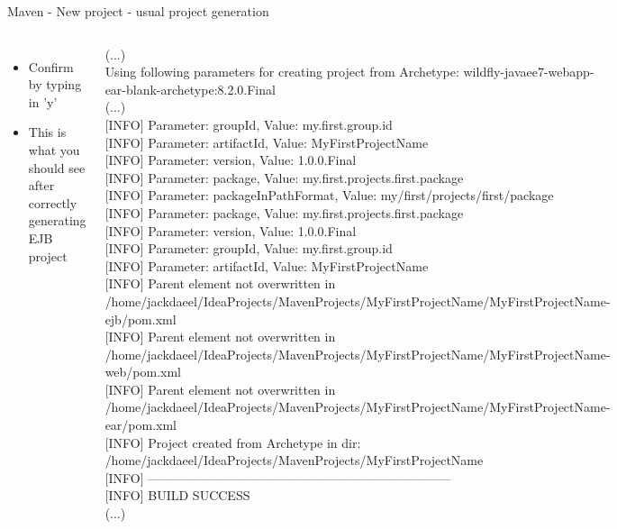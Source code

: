 \documentclass[aspectratio=1610,english]{beamer} %
\begin{document}
\begin{frame}{Maven - New project - usual project generation}
\begin{columns}
				\begin{itemize}
					\tiny
					\color{black}
					\item Confirm by typing in 'y'
					\item This is what you should see after correctly generating EJB project
				\end{itemize}
				\fontsize{4}{5} \selectfont
				(...) \\
				Using following parameters for creating project from Archetype: wildfly-javaee7-webapp-ear-blank-archetype:8.2.0.Final \\
				(...) \\
				{[INFO]} Parameter: groupId, Value: my.first.group.id \\
				{[INFO]} Parameter: artifactId, Value: MyFirstProjectName \\
				{[INFO]} Parameter: version, Value: 1.0.0.Final \\
				{[INFO]} Parameter: package, Value: my.first.projects.first.package \\
				{[INFO]} Parameter: packageInPathFormat, Value: my/first/projects/first/package \\
				{[INFO]} Parameter: package, Value: my.first.projects.first.package \\
				{[INFO]} Parameter: version, Value: 1.0.0.Final \\
				{[INFO]} Parameter: groupId, Value: my.first.group.id \\
				{[INFO]} Parameter: artifactId, Value: MyFirstProjectName \\
				{[INFO]} Parent element not overwritten in /home/jackdaeel/IdeaProjects/MavenProjects/MyFirstProjectName/MyFirstProjectName-ejb/pom.xml \\ 
				{[INFO]} Parent element not overwritten in /home/jackdaeel/IdeaProjects/MavenProjects/MyFirstProjectName/MyFirstProjectName-web/pom.xml \\ 
				{[INFO]} Parent element not overwritten in /home/jackdaeel/IdeaProjects/MavenProjects/MyFirstProjectName/MyFirstProjectName-ear/pom.xml \\ 
				{[INFO]} Project created from Archetype in dir: /home/jackdaeel/IdeaProjects/MavenProjects/MyFirstProjectName \\
				{[INFO]} ------------------------------------------------------------------------ \\
				{[INFO]} BUILD SUCCESS \\
				(...) 
				

\end{columns}
\end{frame}
\end{document}
